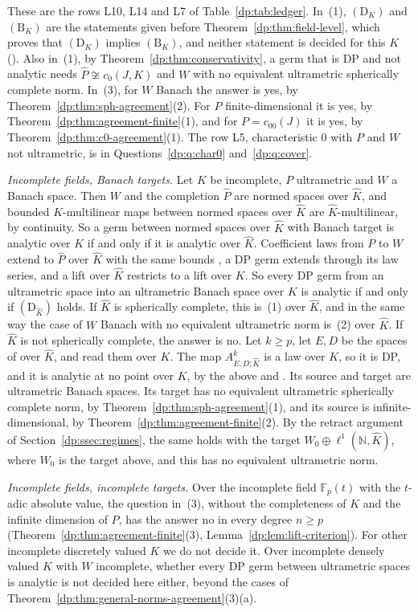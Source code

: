 \documentclass[11pt]{amsart}
\theoremstyle{definition}
\theoremstyle{remark}
\numberwithin{equation}{section}
\newcommand{\N}{\mathbb N}
\newcommand{\F}{\mathbb F}
\newcommand{\Kh}{\widehat K}
\theoremstyle{plain}
\theoremstyle{definition}
\theoremstyle{plain}
\begin{document}
These are the rows L10, L14 and L7 of Table~\ref{dp:tab:ledger}. In~(1), $(\mathrm D_K)$ and $(\mathrm B_K)$ are the statements given before Theorem~\ref{dp:thm:field-level}, which proves that $(\mathrm D_K)$ implies $(\mathrm B_K)$, and neither statement is decided for this $K$ (\cite[Section~12]{I}). Also in~(1), by Theorem~\ref{dp:thm:conservativity}, a germ that is DP and not analytic needs $\widehat P\not\cong c_0(J,K)$ and $W$ with no equivalent ultrametric spherically complete norm. In~(3), for $W$ Banach the answer is yes, by Theorem~\ref{dp:thm:sph-agreement}(2). For $P$ finite-dimensional it is yes, by Theorem~\ref{dp:thm:agreement-finite}(1), and for $P=c_{00}(J)$ it is yes, by Theorem~\ref{dp:thm:c0-agreement}(1). The row L5, characteristic $0$ with $P$ and $W$ not ultrametric, is in Questions~\ref{dp:q:char0} and~\ref{dp:q:cover}.

\emph{Incomplete fields, Banach targets.} Let $K$ be incomplete, $P$ ultrametric and $W$ a Banach space. Then $W$ and the completion $\widehat P$ are normed spaces over $\Kh$, and bounded $K$-multilinear maps between normed spaces over $\Kh$ are $\Kh$-multilinear, by continuity. So a germ between normed spaces over $\Kh$ with Banach target is analytic over $K$ if and only if it is analytic over $\Kh$. Coefficient laws from $P$ to $W$ extend to $\widehat P$ over $\Kh$ with the same bounds \cite[Lemma~Q.13(1),(2)]{I}, a DP germ extends through its law series, and a lift over $\Kh$ restricts to a lift over $K$. So every DP germ from an ultrametric space into an ultrametric Banach space over $K$ is analytic if and only if $(\mathrm D_{\Kh})$ holds. If $\Kh$ is spherically complete, this is~(1) over $\Kh$, and in the same way the case of $W$ Banach with no equivalent ultrametric norm is~(2) over $\Kh$. If $\Kh$ is not spherically complete, the answer is no. Let $k\ge p$, let $E,D$ be the spaces of \cite[Theorem~7.2(2)]{I} over $\Kh$, and read them over $K$. The map $A^k_{E,D;\Kh}$ is a law over $K$, so it is DP, and it is analytic at no point over $K$, by the above and \cite[Theorem~7.2(2)]{I}. Its source and target are ultrametric Banach spaces. Its target has no equivalent ultrametric spherically complete norm, by Theorem~\ref{dp:thm:sph-agreement}(1), and its source is infinite-dimensional, by Theorem~\ref{dp:thm:agreement-finite}(2). By the retract argument of Section~\ref{dp:ssec:regimes}, the same holds with the target $W_0\oplus\ell^1(\N,\Kh)$, where $W_0$ is the target above, and this has no equivalent ultrametric norm.

\emph{Incomplete fields, incomplete targets.} Over the incomplete field $\F_p(t)$ with the $t$-adic absolute value, the question in~(3), without the completeness of $K$ and the infinite dimension of $P$, has the answer no in every degree $n\ge p$ (Theorem~\ref{dp:thm:agreement-finite}(3), Lemma~\ref{dp:lem:lift-criterion}). For other incomplete discretely valued $K$ we do not decide it. Over incomplete densely valued $K$ with $W$ incomplete, whether every DP germ between ultrametric spaces is analytic is not decided here either, beyond the cases of Theorem~\ref{dp:thm:general-norms-agreement}(3)(a).
\end{document}
